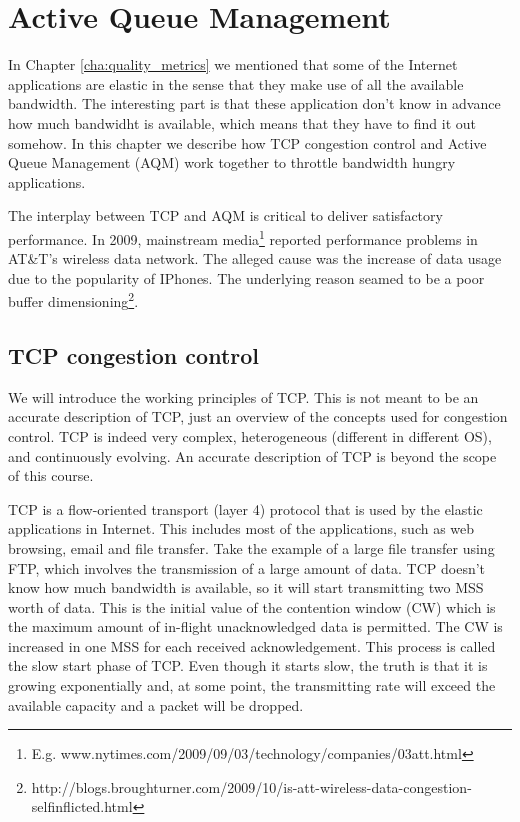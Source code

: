 \chapter{Active Queue Management}

In Chapter \ref{cha:quality_metrics} we mentioned that some of the Internet applications are elastic in the sense that they make use of all the available bandwidth.
The interesting part is that these application don't know in advance how much bandwidht is available, which means that they have to find it out somehow.
In this chapter we describe how TCP congestion control and Active Queue Management (AQM) work together to throttle bandwidth hungry applications.

The interplay between TCP and AQM is critical to deliver satisfactory performance.
In 2009, mainstream media\footnote{E.g. www.nytimes.com/2009/09/03/technology/companies/03att.html} reported performance problems in AT\&T's wireless data network.
The alleged cause was the increase of data usage due to the popularity of IPhones.
The underlying reason seamed to be a poor buffer dimensioning\footnote{http://blogs.broughturner.com/2009/10/is-att-wireless-data-congestion-selfinflicted.html}.

\section{TCP congestion control}
We will introduce the working principles of TCP.
This is not meant to be an accurate description of TCP, just an overview of the concepts used for congestion control.
TCP is indeed very complex, heterogeneous (different in different OS), and continuously evolving.
An accurate description of TCP is beyond the scope of this course.

TCP is a flow-oriented transport (layer 4) protocol that is used by the elastic applications in Internet.
This includes most of the applications, such as web browsing, email and file transfer.
Take the example of a large file transfer using FTP, which involves the transmission of a large amount of data.
TCP doesn't know how much bandwidth is available, so it will start transmitting two MSS worth of data.
This is the initial value of the contention window (CW) which is the maximum amount of in-flight unacknowledged data is permitted.
The CW is increased in one MSS for each received acknowledgement.
This process is called the slow start phase of TCP.
Even though it starts slow, the truth is that it is growing exponentially and, at some point, the transmitting rate will exceed the available capacity and a packet will be dropped.


